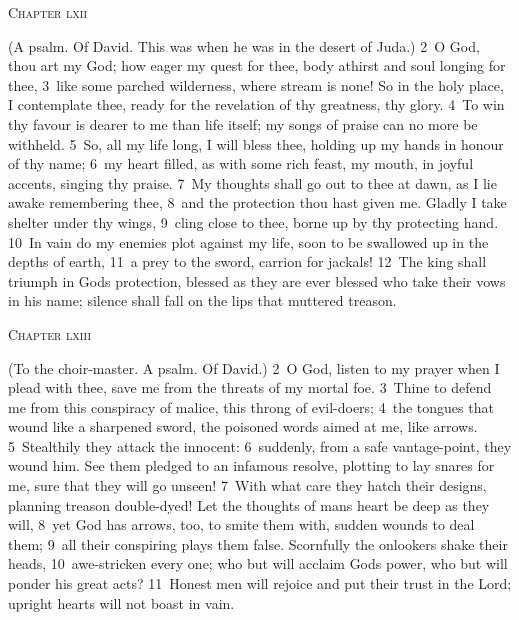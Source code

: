 \documentclass[10pt]{book} %
\begin{document}
\begin{large}\begin{center}\textsc{Chapter lxii}\end{center}\end{large}
(A psalm. Of David. This was when he was in the desert of Juda.)
\textcolor{benred8}{2}~O God, thou art my God; how eager my quest for thee, body athirst and soul longing for thee, \textcolor{benred8}{3}~like some parched wilderness, where stream is none! So in the holy place, I contemplate thee, ready for the revelation of thy greatness, thy glory. \textcolor{benred8}{4}~To win thy favour is dearer to me than life itself; my songs of praise can no more be withheld. \textcolor{benred8}{5}~So, all my life long, I will bless thee, holding up my hands in honour of thy name; \textcolor{benred8}{6}~my heart filled, as with some rich feast, my mouth, in joyful accents, singing thy praise. \textcolor{benred8}{7}~My thoughts shall go out to thee at dawn, as I lie awake remembering thee, \textcolor{benred8}{8}~and the protection thou hast given me. Gladly I take shelter under thy wings, \textcolor{benred8}{9}~cling close to thee, borne up by thy protecting hand. \textcolor{benred8}{10}~In vain do my enemies plot against my life, soon to be swallowed up in the depths of earth, \textcolor{benred8}{11}~a prey to the sword, carrion for jackals! \textcolor{benred8}{12}~The king shall triumph in God\textquotesingle s protection, blessed as they are ever blessed who take their vows in his name; silence shall fall on the lips that muttered treason.
\begin{large}\begin{center}\textsc{Chapter lxiii}\end{center}\end{large}
(To the choir-master. A psalm. Of David.)
\textcolor{benred8}{2}~O God, listen to my prayer when I plead with thee, save me from the threats of my mortal foe. \textcolor{benred8}{3}~Thine to defend me from this conspiracy of malice, this throng of evil-doers; \textcolor{benred8}{4}~the tongues that wound like a sharpened sword, the poisoned words aimed at me, like arrows. \textcolor{benred8}{5}~Stealthily they attack the innocent: \textcolor{benred8}{6}~suddenly, from a safe vantage-point, they wound him. See them pledged to an infamous resolve, plotting to lay snares for me, sure that they will go unseen! \textcolor{benred8}{7}~With what care they hatch their designs, planning treason double-dyed! Let the thoughts of man\textquotesingle s heart be deep as they will, \textcolor{benred8}{8}~yet God has arrows, too, to smite them with, sudden wounds to deal them; \textcolor{benred8}{9}~all their conspiring plays them false. Scornfully the onlookers shake their heads, \textcolor{benred8}{10}~awe-stricken every one; who but will acclaim God\textquotesingle s power, who but will ponder his great acts? \textcolor{benred8}{11}~Honest men will rejoice and put their trust in the Lord; upright hearts will not boast in vain.
\end{document}
